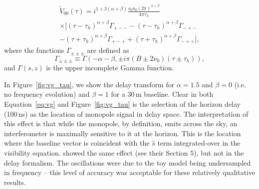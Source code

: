 \begin{multline}
\tilde{V}_{00}(\tau) = i^{1 + 3(\alpha+\beta)} \frac{s_0 a_0 (2\pi)^{\alpha+\beta}}{4\pi\tau_h} \\
\times \Big[(\tau-\tau_h)^{\alpha+\beta}\Gamma_{+--} - (\tau-\tau_h)^{\alpha+\beta}\Gamma_{-+-} \\
 - (\tau+\tau_h)^{\alpha+\beta}\Gamma_{+-+} + (\tau+\tau_h)^{\alpha+\beta}\Gamma_{-++}\Big], 
\label{eq:vg}
\end{multline}
where the functions $\Gamma_{\pm\pm\pm}$ are defined as
\begin{equation}
\Gamma_{\pm\pm\pm} \equiv \Gamma(-\alpha-\beta, \pm i \pi (B \pm 2\nu_0)(\tau \pm \tau_h)),
\end{equation}
and $\Gamma(s, z)$ is the upper incomplete Gamma function.

In Figure~\ref{fig:vg_tau}, we show the delay transform for $\alpha=1.5$ and $\beta=0$ (i.e. no frequency evolution) and $\beta=1$ for a 30\,m baseline. Clear in both Equation~\ref{eq:vg} and Figure~\ref{fig:vg_tau} is the selection of the horizon delay (100\,ns) as the location of monopole signal in delay space. 
The interpretation of this effect is that while the monopole, by definition, emits across the sky, an interferometer is maximally sensitive to it at the horizon. This is the location where the baseline vector is coincident with the $\hat{s}$ term integrated-over in the visibility equation. \cite{Venumadhav.16} showed the same effect (see their Section 5), but not in the delay formalism. The oscillations were due to the toy model being undersampled in frequency -- this level of accuracy was acceptable for these relatively qualitative results.

